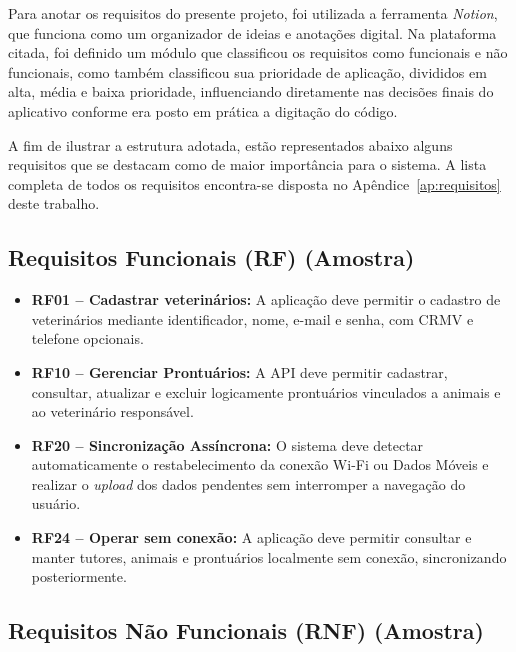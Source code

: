 Para anotar os requisitos do presente projeto, foi utilizada a ferramenta \textit{Notion}, que funciona como um organizador de ideias e anotações digital. Na plataforma citada, foi definido um módulo que classificou os requisitos como funcionais e não funcionais, como também classificou sua prioridade de aplicação, divididos em alta, média e baixa prioridade, influenciando diretamente nas decisões finais do aplicativo conforme era posto em prática a digitação do código.

A fim de ilustrar a estrutura adotada, estão representados abaixo alguns requisitos que se destacam como de maior importância para o sistema. A lista completa de todos os requisitos encontra-se disposta no Apêndice~\ref{ap:requisitos} deste trabalho.

\subsection{Requisitos Funcionais (RF) (Amostra)}

\begin{itemize}
    \item \textbf{RF01 -- Cadastrar veterinários:} A aplicação deve permitir o cadastro de veterinários mediante identificador, nome, e-mail e senha, com CRMV e telefone opcionais.

    \item \textbf{RF10 -- Gerenciar Prontuários:} A API deve permitir cadastrar, consultar, atualizar e excluir logicamente prontuários vinculados a animais e ao veterinário responsável.

    \item \textbf{RF20 -- Sincronização Assíncrona:} O sistema deve detectar automaticamente o restabelecimento da conexão Wi-Fi ou Dados Móveis e realizar o \textit{upload} dos dados pendentes sem interromper a navegação do usuário.

    \item \textbf{RF24 -- Operar sem conexão:} A aplicação deve permitir consultar e manter tutores, animais e prontuários localmente sem conexão, sincronizando posteriormente.

\end{itemize}

\subsection{Requisitos Não Funcionais (RNF) (Amostra)}

